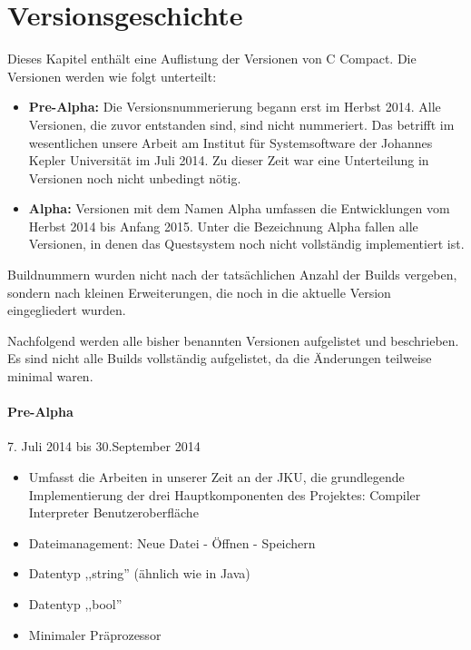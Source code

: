 

\chapter{Versionsgeschichte}
Dieses Kapitel enthält eine Auflistung der Versionen von C Compact. Die Versionen werden wie folgt unterteilt:
\begin{itemize}
\item \textbf{Pre-Alpha:} Die Versionsnummerierung begann erst im Herbst 2014. Alle Versionen, die zuvor entstanden sind, sind nicht nummeriert. Das betrifft im wesentlichen unsere Arbeit am Institut für Systemsoftware der Johannes Kepler Universität im Juli 2014. Zu dieser Zeit war eine Unterteilung in Versionen noch nicht unbedingt nötig.
\item \textbf{Alpha:} Versionen mit dem Namen Alpha umfassen die Entwicklungen vom Herbst 2014 bis Anfang 2015. Unter die Bezeichnung Alpha fallen alle Versionen, in denen das Questsystem noch nicht vollständig implementiert ist.
\end{itemize}

Buildnummern wurden nicht nach der tatsächlichen Anzahl der Builds vergeben, sondern nach kleinen Erweiterungen, die noch in die aktuelle Version eingegliedert wurden.

Nachfolgend werden alle bisher benannten Versionen aufgelistet und beschrieben. Es sind nicht alle Builds vollständig aufgelistet, da die Änderungen teilweise minimal waren.

\subsubsection*{Pre-Alpha}
7. Juli 2014 bis 30.September 2014
\begin{itemize}
\item Umfasst die Arbeiten in unserer Zeit an der JKU, die grundlegende Implementierung der drei Hauptkomponenten des Projektes:
\subitem Compiler
\subitem Interpreter
\subitem Benutzeroberfläche
\item Dateimanagement: Neue Datei - Öffnen - Speichern
\item Datentyp ,,string'' (ähnlich wie in Java)
\item Datentyp ,,bool''
\item Minimaler Präprozessor
\end{itemize}

